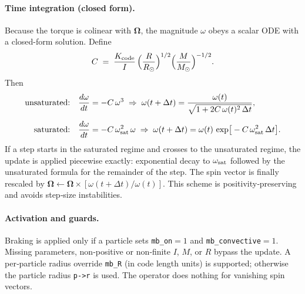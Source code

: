 \documentclass[11pt]{article}
\begin{document}
\paragraph{Time integration (closed form).}
Because the torque is colinear with $\boldsymbol{\Omega}$,
the magnitude $\omega$ obeys a scalar ODE with a closed-form solution. Define
\begin{equation}
C \;=\; \frac{K_{\rm code}}{I}\,
\Big(\frac{R}{R_\odot}\Big)^{1/2}\Big(\frac{M}{M_\odot}\Big)^{-1/2}.
\end{equation}
Then
\begin{align}
\text{unsaturated:}\quad
&\frac{d\omega}{dt} = -C\,\omega^3
\;\Rightarrow\;
\omega(t+\Delta t) = \frac{\omega(t)}{\sqrt{1+2C\,\omega(t)^2\,\Delta t}},
\\[4pt]
\text{saturated:}\quad
&\frac{d\omega}{dt} = -C\,\omega_{\rm sat}^2\,\omega
\;\Rightarrow\;
\omega(t+\Delta t) = \omega(t)\,\exp\!\big[-C\,\omega_{\rm sat}^2\,\Delta t\big].
\end{align}
If a step starts in the saturated regime and crosses to the unsaturated regime,
the update is applied piecewise exactly: exponential decay to
$\omega_{\rm sat}$ followed by the unsaturated formula for the remainder of the
step. The spin vector is finally rescaled by
$\boldsymbol{\Omega}\leftarrow \boldsymbol{\Omega}\times[\omega(t+\Delta t)/\omega(t)]$.
This scheme is positivity‑preserving and avoids step‑size instabilities.

\paragraph{Activation and guards.}
Braking is applied only if a particle sets \texttt{mb\_on}$=1$ and
\texttt{mb\_convective}$=1$. Missing parameters, non‑positive or non‑finite
$I$, $M$, or $R$ bypass the update. A per‑particle radius override
\texttt{mb\_R} (in code length units) is supported; otherwise the particle
radius \texttt{p->r} is used. The operator does nothing for vanishing spin
vectors.
\end{document}
